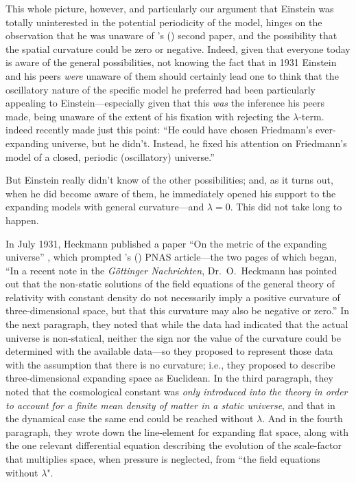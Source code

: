 \documentclass[12 pt]{article}
\def\citeapos#1{\citeauthor{#1}'s (\citeyear{#1})}
\begin{document}
This whole picture, however, and particularly our argument that Einstein was totally uninterested in the potential periodicity of the model, hinges on the observation that he was unaware of \citeapos{Friedmann1924} second paper, and the possibility that the spatial curvature could be zero or negative. Indeed, given that everyone today is aware of the general possibilities, not knowing the fact that in 1931 Einstein and his peers \textit{were} unaware of them should certainly lead one to think that the oscillatory nature of the specific model he preferred had been particularly appealing to Einstein---especially given that this \textit{was} the inference his peers made, being unaware of the extent of his fixation with rejecting the $\lambda$-term. \citet[pp.~176-178]{Steinhardt2007} indeed recently made just this point: ``He could have chosen Friedmann's ever-expanding universe, but he didn't. Instead, he fixed his attention on Friedmann's model of a closed, periodic (oscillatory) universe.''

But Einstein really didn't know of the other possibilities; and, as it turns out, when he did become aware of them, he immediately opened his support to the expanding models with general curvature---and $\lambda=0$. This did not take long to happen.

In July 1931, Heckmann published a paper ``On the metric of the expanding universe'' \citep{Heckmann1931}, which prompted \citeapos{Einstein1932} PNAS article---the two pages of which began, ``In a recent note in the \textit{G\"{o}ttinger Nachrichten}, Dr.\ O.\ Heckmann has pointed out that the non-static solutions of the field equations of the general theory of relativity with constant density do not necessarily imply a positive curvature of three-dimensional space, but that this curvature may also be negative or zero.'' In the next paragraph, they noted that while the data had indicated that the actual universe is non-statical, neither the sign nor the value of the curvature could be determined with the available data---so they proposed to represent those data with the assumption that there is no curvature; i.e., they proposed to describe three-dimensional expanding space as Euclidean. In the third paragraph, they noted that the cosmological constant was \textit{only introduced into the theory in order to account for a finite mean density of matter in a static universe}, and that in the dynamical case the same end could be reached without $\lambda$. And in the fourth paragraph, they wrote down the line-element for expanding flat space, along with the one relevant differential equation describing the evolution of the scale-factor that multiplies space, when pressure is neglected, from ``the field equations without $\lambda$". 
\end{document}
